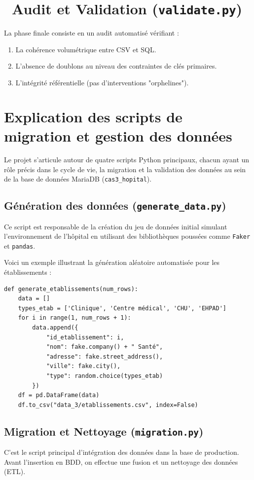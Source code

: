 \documentclass[12pt, a4paper]{article}
\begin{document}
\section{\faSearch \ Audit et Validation (\texttt{validate.py})}
La phase finale consiste en un audit automatisé vérifiant :
\begin{enumerate}
    \item La cohérence volumétrique entre CSV et SQL.
    \item L'absence de doublons au niveau des contraintes de clés primaires.
    \item L'intégrité référentielle (pas d'interventions "orphelines").
\end{enumerate}

\section{Explication des scripts de migration et gestion des données}

Le projet s'articule autour de quatre scripts Python principaux, chacun ayant un rôle précis dans le cycle de vie, la migration et la validation des données au sein de la base de données MariaDB (\texttt{cas3\_hopital}).

\subsection{Génération des données (\texttt{generate\_data.py})}
Ce script est responsable de la création du jeu de données initial simulant l'environnement de l'hôpital en utilisant des bibliothèques poussées comme \texttt{Faker} et \texttt{pandas}.

Voici un exemple illustrant la génération aléatoire automatisée pour les établissements :
\begin{lstlisting}
def generate_etablissements(num_rows):
    data = []
    types_etab = ['Clinique', 'Centre médical', 'CHU', 'EHPAD']
    for i in range(1, num_rows + 1):
        data.append({
            "id_etablissement": i,
            "nom": fake.company() + " Santé",
            "adresse": fake.street_address(),
            "ville": fake.city(),
            "type": random.choice(types_etab)
        })
    df = pd.DataFrame(data)
    df.to_csv("data_3/etablissements.csv", index=False)
\end{lstlisting}

\subsection{Migration et Nettoyage (\texttt{migration.py})}
C'est le script principal d'intégration des données dans la base de production. Avant l'insertion en BDD, on effectue une fusion et un nettoyage des données (ETL).
\end{document}
